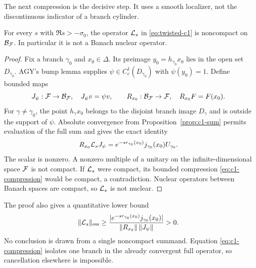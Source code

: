 The next compression is the decisive step.  It uses a smooth localizer, not
the discontinuous indicator of a branch cylinder.

\begin{theorem}
\label{thm:c1-noncompact}
For every \(s\) with \(\Re s>-\sigma _0\), the operator \(\mathcal L_s\) in
\eqref{eq:twisted-c1} is noncompact on \(\mathcal B_\mathcal F\).  In particular it is not
a Banach nuclear operator.
\end{theorem}

\begin{proof}
Fix a branch \(\gamma_0\) and \(x_0\in\Delta\).  Its preimage
\(y_0=h_{\gamma_0}x_0\) lies in the open set \(D_{\gamma_0}\).  AGY's bump
lemma supplies \(\psi\in C_c^1(D_{\gamma_0})\) with \(\psi(y_0)=1\).
Define bounded maps
\[
 J_\psi:\mathcal F\to\mathcal B_\mathcal F,
 \quad J_\psi v=\psi v,
 \qquad
 R_{x_0}:\mathcal B_\mathcal F\to\mathcal F,
 \quad R_{x_0}F=F(x_0).
\]
For \(\gamma\ne\gamma_0\), the point \(h_\gamma x_0\) belongs to the
disjoint branch image \(D_\gamma\) and is outside the support of \(\psi\).
Absolute convergence from Proposition~\ref{prop:c1-sum} permits evaluation
of the full sum and gives the exact identity
\begin{equation}
 R_{x_0}\mathcal L_sJ_\psi
 =e^{-sr_{\gamma_0}(x_0)}j_{\gamma_0}(x_0)U_{\gamma_0}.
 \label{eq:c1-compression}
\end{equation}
The scalar is nonzero.  A nonzero multiple of a unitary on the
infinite-dimensional space \(\mathcal F\) is not compact.  If \(\mathcal L_s\) were
compact, its bounded compression \eqref{eq:c1-compression} would be compact,
a contradiction.  Nuclear operators between Banach spaces are compact, so
\(\mathcal L_s\) is not nuclear.
\end{proof}

The proof also gives a quantitative lower bound
\begin{equation}
 \|\mathcal L_s\|_{\mathrm{ess}}
 \ge
 \frac{|e^{-sr_{\gamma_0}(x_0)}j_{\gamma_0}(x_0)|}
      {\|R_{x_0}\|\,\|J_\psi\|}>0.
 \label{eq:c1-essential}
\end{equation}
No conclusion is drawn from a single noncompact summand.  Equation
\eqref{eq:c1-compression} isolates one branch in the already convergent full
operator, so cancellation elsewhere is impossible.
